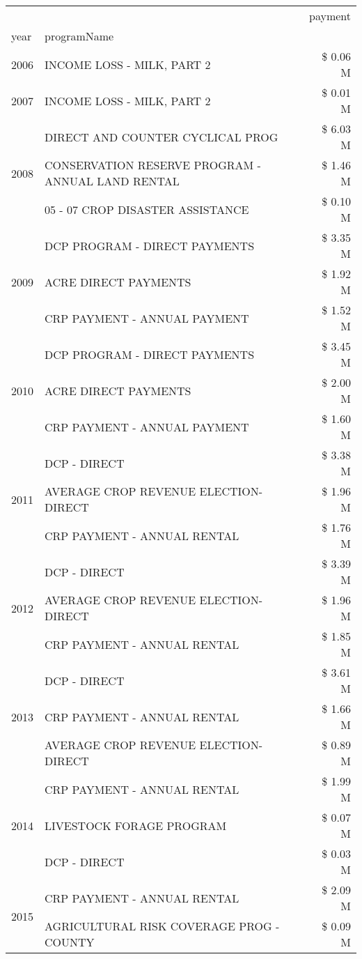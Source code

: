 \begin{tabular}{llr}
\toprule
 &  & payment \\
year & programName &  \\
\midrule
2006 & INCOME LOSS - MILK, PART 2 & \$ 0.06 M \\
\cline{1-3}
2007 & INCOME LOSS - MILK, PART 2 & \$ 0.01 M \\
\cline{1-3}
\multirow[t]{3}{*}{2008} & DIRECT AND COUNTER CYCLICAL PROG & \$ 6.03 M \\
 & CONSERVATION RESERVE PROGRAM - ANNUAL LAND RENTAL & \$ 1.46 M \\
 & 05 - 07 CROP DISASTER ASSISTANCE & \$ 0.10 M \\
\cline{1-3}
\multirow[t]{3}{*}{2009} & DCP PROGRAM - DIRECT PAYMENTS & \$ 3.35 M \\
 & ACRE DIRECT PAYMENTS & \$ 1.92 M \\
 & CRP PAYMENT - ANNUAL PAYMENT & \$ 1.52 M \\
\cline{1-3}
\multirow[t]{3}{*}{2010} & DCP PROGRAM - DIRECT PAYMENTS & \$ 3.45 M \\
 & ACRE DIRECT PAYMENTS & \$ 2.00 M \\
 & CRP PAYMENT - ANNUAL PAYMENT & \$ 1.60 M \\
\cline{1-3}
\multirow[t]{3}{*}{2011} & DCP - DIRECT & \$ 3.38 M \\
 & AVERAGE CROP REVENUE ELECTION-DIRECT & \$ 1.96 M \\
 & CRP PAYMENT - ANNUAL RENTAL & \$ 1.76 M \\
\cline{1-3}
\multirow[t]{3}{*}{2012} & DCP - DIRECT & \$ 3.39 M \\
 & AVERAGE CROP REVENUE ELECTION-DIRECT & \$ 1.96 M \\
 & CRP PAYMENT - ANNUAL RENTAL & \$ 1.85 M \\
\cline{1-3}
\multirow[t]{3}{*}{2013} & DCP - DIRECT & \$ 3.61 M \\
 & CRP PAYMENT - ANNUAL RENTAL & \$ 1.66 M \\
 & AVERAGE CROP REVENUE ELECTION-DIRECT & \$ 0.89 M \\
\cline{1-3}
\multirow[t]{3}{*}{2014} & CRP PAYMENT - ANNUAL RENTAL & \$ 1.99 M \\
 & LIVESTOCK FORAGE PROGRAM & \$ 0.07 M \\
 & DCP - DIRECT & \$ 0.03 M \\
\cline{1-3}
\multirow[t]{3}{*}{2015} & CRP PAYMENT - ANNUAL RENTAL & \$ 2.09 M \\
 & AGRICULTURAL RISK COVERAGE PROG - COUNTY & \$ 0.09 M \\

\end{tabular}
